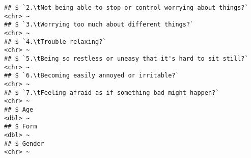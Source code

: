 \documentclass[
]{article}
\begin{document}
\begin{verbatim}
## $ `2.\tNot being able to stop or control worrying about things?`                                                                                                                   <chr> ~
## $ `3.\tWorrying too much about different things?`                                                                                                                                  <chr> ~
## $ `4.\tTrouble relaxing?`                                                                                                                                                          <chr> ~
## $ `5.\tBeing so restless or uneasy that it's hard to sit still?`                                                                                                                   <chr> ~
## $ `6.\tBecoming easily annoyed or irritable?`                                                                                                                                      <chr> ~
## $ `7.\tFeeling afraid as if something bad might happen?`                                                                                                                           <chr> ~
## $ Age                                                                                                                                                                              <dbl> ~
## $ Form                                                                                                                                                                             <dbl> ~
## $ Gender                                                                                                                                                                           <chr> ~
\end{verbatim}
\end{document}
